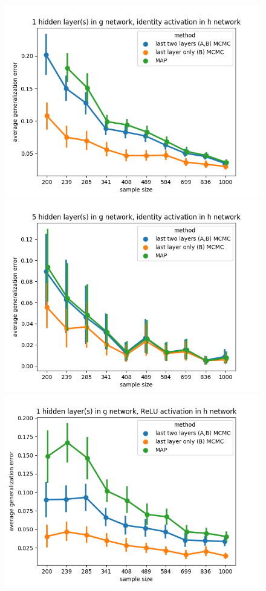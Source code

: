 \documentclass[11pt]{article}
\numberwithin{equation}{section}
\theoremstyle{plain}
\theoremstyle{definition}
\begin{document}
\newpage
\begin{figure}[t!]
	\begin{center}
		\includegraphics[scale=0.45]{taskid12.png}
		\includegraphics[scale=0.45]{taskid13.png}
		\includegraphics[scale=0.45]{taskid14.png}

\end{center}
\end{figure}
\end{document}
